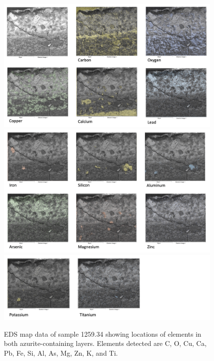 \begin{figure}[H]
\centering
\begin{minipage}[t]{\linewidth}
  \centering
  \includegraphics[width=0.9\linewidth]{1259-34_mapdata_1}
\hfill
\includegraphics[width=0.9\linewidth]{1259-34_mapdata_2}
\hfill
\includegraphics[width=0.9\linewidth]{1259-34_mapdata_3}
\hfill
\end{minipage}
\caption[EDS map data, sample 1259.34.]{EDS map data of sample 1259.34 showing locations of elements in both azurite-containing layers. Elements detected are C, O, Cu, Ca, Pb, Fe, Si, Al, As, Mg, Zn, K, and Ti.}
\label{fig:1259.34_mapdata}
\end{figure}

